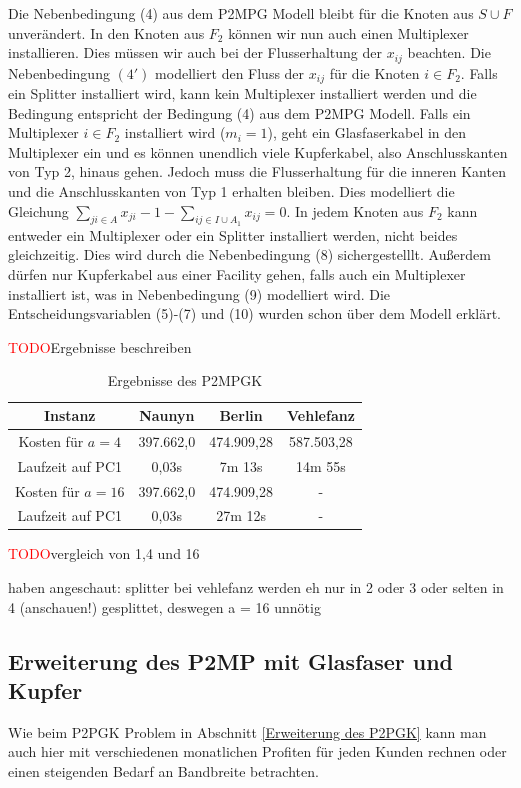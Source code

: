 \documentclass[11pt,a4paper]{article}
\newcommand{\TODO}{\textcolor{red}{TODO}}
\theoremstyle{my_th_style1}
\begin{document}
Die Nebenbedingung (4) aus dem P2MPG Modell bleibt für die Knoten aus $S \cup F$ unver\"andert.
In den Knoten aus $F_2$ können wir nun auch einen Multiplexer installieren.
Dies müssen wir auch bei der Flusserhaltung der $x_{ij}$ beachten.
Die Nebenbedingung \((4')\) modelliert den Fluss der $x_{ij}$ für die Knoten $i \in F_2$.
Falls ein Splitter installiert wird, kann kein Multiplexer installiert werden und die Bedingung entspricht der Bedingung (4) aus dem P2MPG Modell.
Falls ein Multiplexer $i \in F_2$ installiert wird ($m_i=1$), geht ein Glasfaserkabel in den Multiplexer ein und es k\"onnen unendlich viele Kupferkabel, also Anschlusskanten von Typ 2, hinaus gehen.
Jedoch muss die Flusserhaltung f\"ur die inneren Kanten und die Anschlusskanten von Typ 1 erhalten bleiben.
Dies modelliert die Gleichung $\displaystyle\sum_{ji \in A} x_{ji} -1 - \displaystyle\sum_{ij \in I \cup A_1} x_{ij}=0$.
In jedem Knoten aus $F_2$ kann entweder ein Multiplexer oder ein Splitter installiert werden, nicht beides gleichzeitig.
Dies wird durch die Nebenbedingung (8) sichergestelllt.
Außerdem d\"urfen nur Kupferkabel aus einer Facility gehen, falls auch ein Multiplexer installiert ist, was in Nebenbedingung (9) modelliert wird.
Die Entscheidungsvariablen (5)-(7) und (10) wurden schon \"uber dem Modell erkl\"art.   

   \TODO Ergebnisse beschreiben
 \begin{table}[h]
	\centering
	\begin{tabular}{c|c|c|c}
		Instanz & Naunyn & Berlin & Vehlefanz \\	
		\hline
		Kosten für $a=4$ & 397.662,0 & 474.909,28 & 587.503,28 \\
		Laufzeit auf PC1 & 0,03s & 7m 13s & 14m 55s \\
		\hline
		Kosten für $a=16$ & 397.662,0 & 474.909,28 & -\\
		Laufzeit auf PC1 & 0,03s & 27m 12s & - \\
	\end{tabular}
	\label{P2MPGK}
	\caption{Ergebnisse des P2MPGK} 
\end{table}
\TODO vergleich von 1,4 und 16 

haben angeschaut: splitter bei vehlefanz werden eh nur in 2 oder 3 oder selten in 4 (anschauen!) gesplittet, deswegen a = 16 unnötig
   
 \subsection{Erweiterung des P2MP mit Glasfaser und Kupfer}
Wie beim P2PGK Problem in Abschnitt \ref{Erweiterung des P2PGK} kann man auch hier mit verschiedenen monatlichen Profiten f\"ur jeden Kunden rechnen oder einen steigenden Bedarf an Bandbreite betrachten.
 
\end{document}

